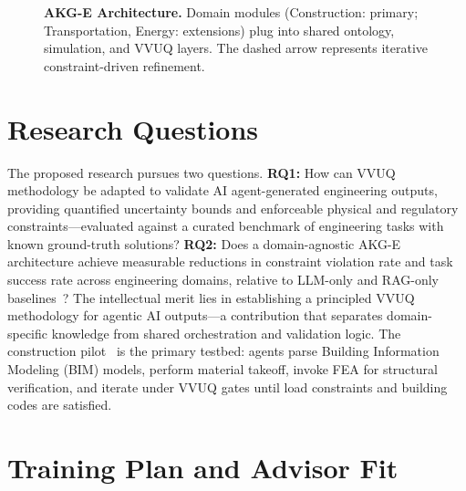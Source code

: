\documentclass[conference, 10pt]{IEEEtran}
\begin{document}
\begin{figure}[t]
{
    }%
    \caption{\textbf{AKG-E Architecture.} Domain modules (Construction: primary; Transportation, Energy: extensions) plug into shared ontology, simulation, and VVUQ layers. The dashed arrow represents iterative constraint-driven refinement.}
    \label{fig:framework}
    \vspace{-0.5em}
\end{figure}

\section*{Research Questions}

The proposed research pursues two questions. \textbf{RQ1:} How can VVUQ methodology be adapted to validate AI agent-generated engineering outputs, providing quantified uncertainty bounds and enforceable physical and regulatory constraints---evaluated against a curated benchmark of engineering tasks with known ground-truth solutions? \textbf{RQ2:} Does a domain-agnostic AKG-E architecture achieve measurable reductions in constraint violation rate and task success rate across engineering domains, relative to LLM-only and RAG-only baselines~\cite{Lewis2020RAG}? The intellectual merit lies in establishing a principled VVUQ methodology for agentic AI outputs---a contribution that separates domain-specific knowledge from shared orchestration and validation logic. The construction pilot~\cite{Eastman2011BIM} is the primary testbed: agents parse Building Information Modeling (BIM) models, perform material takeoff, invoke FEA for structural verification, and iterate under VVUQ gates until load constraints and building codes are satisfied.

\section*{Training Plan and Advisor Fit}
\end{document}
